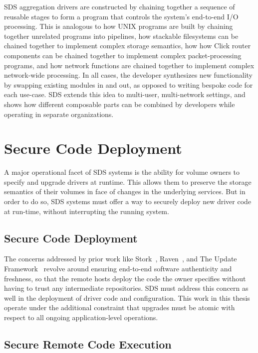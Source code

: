 SDS aggregation drivers are constructed by chaining together a sequence of
reusable stages to form a program that controls the system's
end-to-end I/O processing.  This is analogous to how UNIX programs are built
by chaining together unrelated programs into pipelines, how stackable
filesystems can be chained together to implement complex storage semantics, how
how Click router components can be chained together to implement complex
packet-processing programs, and how network functions are chained together to
implement complex network-wide processing.
In all cases, the developer synthesizes new functionality by swapping existing
modules in and out, as opposed to writing bespoke code for each use-case.
SDS extends this idea to multi-user, multi-network settings, and shows how different
composable parts can be combined by developers
while operating in separate organizations.

\section{Secure Code Deployment}

A major operational facet of SDS systems is the ability for volume owners
to specify and upgrade drivers at runtime.  This allows them to preserve the
storage semantics of their volumes in face of changes in the underlying
services.  But in order to do so, SDS systems must offer a way to securely
deploy new driver code at run-time, without interrupting the running system.

\subsection{Secure Code Deployment}

The concerns addressed by prior work like Stork~\cite{stork},
Raven~\cite{raven}, and The Update Framework~\cite{TUF}
revolve around ensuring end-to-end software authenticity and
freshness, so that the remote hosts deploy the code the owner specifies without
having to trust any intermediate repositories.
SDS must address this concern as
well in the deployment of driver code and configuration.  This work in this
thesis operate under the additional constraint that upgrades must be atomic with
respect to all ongoing application-level operations.

\subsection{Secure Remote Code Execution}

